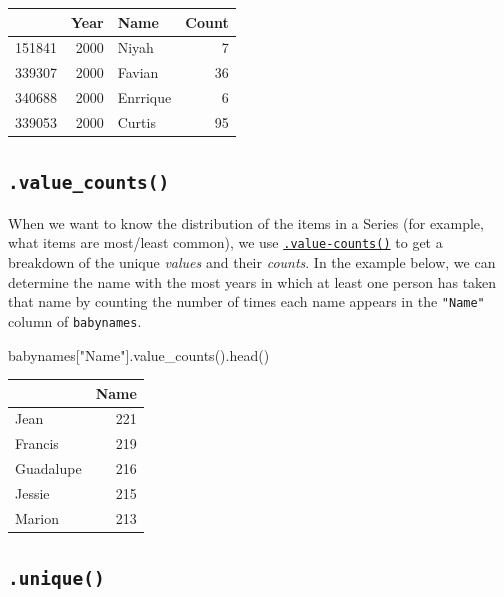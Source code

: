 \documentclass[
  letterpaper,
  DIV=11,
  numbers=noendperiod]{scrreprt}
\newenvironment{Shaded}{\begin{snugshade}}{\end{snugshade}}
\newcommand{\NormalTok}[1]{\textcolor[rgb]{0.00,0.23,0.31}{#1}}
\newcommand{\StringTok}[1]{\textcolor[rgb]{0.13,0.47,0.30}{#1}}
\begin{document}
\begin{tabular}{lrlr}
\toprule
{} &  Year &      Name &  Count \\
\midrule
151841 &  2000 &     Niyah &      7 \\
339307 &  2000 &    Favian &     36 \\
340688 &  2000 &  Enrrique &      6 \\
339053 &  2000 &    Curtis &     95 \\
\bottomrule
\end{tabular}

\hypertarget{value_counts}{%
\subsection{\texorpdfstring{\texttt{.value\_counts()}}{.value\_counts()}}\label{value_counts}}

When we want to know the distribution of the items in a Series (for
example, what items are most/least common), we use
\href{https://pandas.pydata.org/docs/reference/api/pandas.Series.value_counts.html}{\texttt{.value-counts()}}
to get a breakdown of the unique \emph{values} and their \emph{counts}.
In the example below, we can determine the name with the most years in
which at least one person has taken that name by counting the number of
times each name appears in the \texttt{"Name"} column of
\texttt{babynames}.

\begin{Shaded}
\begin{Highlighting}[]
\NormalTok{babynames[}\StringTok{"Name"}\NormalTok{].value\_counts().head()}
\end{Highlighting}
\end{Shaded}

\begin{tabular}{lr}
\toprule
{} &  Name \\
\midrule
Jean      &   221 \\
Francis   &   219 \\
Guadalupe &   216 \\
Jessie    &   215 \\
Marion    &   213 \\
\bottomrule
\end{tabular}

\hypertarget{unique}{%
\subsection{\texorpdfstring{\texttt{.unique()}}{.unique()}}\label{unique}}
\end{document}

